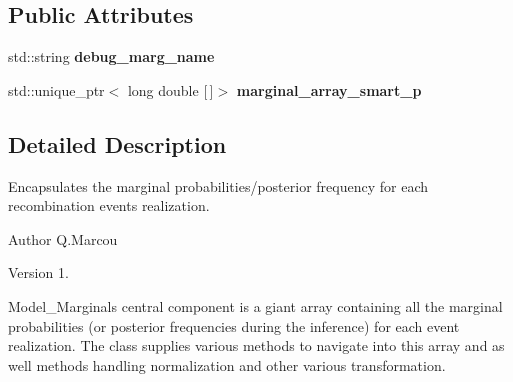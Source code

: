 \subsection*{Public Attributes}
\begin{DoxyCompactItemize}
\item 
\mbox{\label{classModel__marginals_a1736cfe21de1850972f94a42cebfd593}} 
std\+::string {\bfseries debug\+\_\+marg\+\_\+name}
\item 
\mbox{\label{classModel__marginals_a918c349bdf1ff0b8da608bd2aa813a2c}} 
std\+::unique\+\_\+ptr$<$ long double \mbox{[}$\,$\mbox{]}$>$ {\bfseries marginal\+\_\+array\+\_\+smart\+\_\+p}
\end{DoxyCompactItemize}


\subsection{Detailed Description}
Encapsulates the marginal probabilities/posterior frequency for each recombination event\textquotesingle{}s realization. 

\begin{DoxyAuthor}{Author}
Q.\+Marcou 
\end{DoxyAuthor}
\begin{DoxyVersion}{Version}
1.
\end{DoxyVersion}
Model\+\_\+\+Marginals central component is a giant array containing all the marginal probabilities (or posterior frequencies during the inference) for each event realization. The class supplies various methods to navigate into this array and as well methods handling normalization and other various transformation. 


